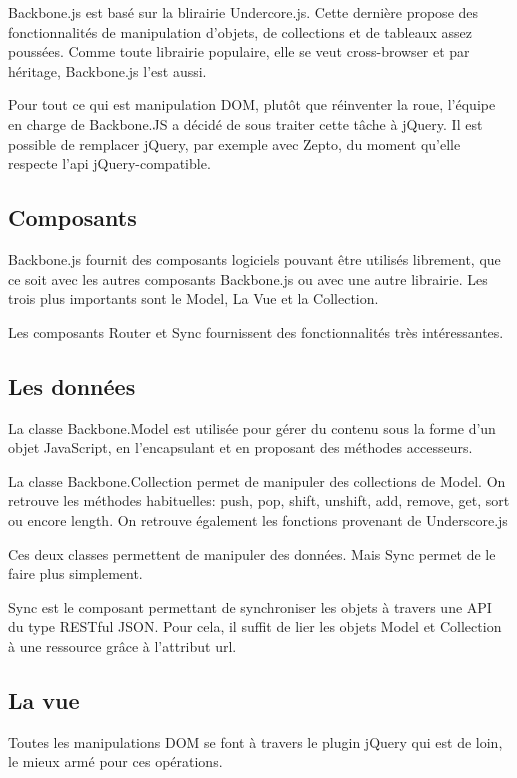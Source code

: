 Backbone.js est basé sur la blirairie Undercore.js. Cette dernière propose des fonctionnalités de manipulation d’objets, de collections et de tableaux assez poussées. Comme toute librairie populaire, elle se veut cross-browser et par héritage, Backbone.js l’est aussi.

Pour tout ce qui est manipulation DOM, plutôt que réinventer la roue, l’équipe en charge de Backbone.JS a décidé de sous traiter cette tâche à jQuery. Il est possible de remplacer jQuery, par exemple avec Zepto, du moment qu’elle respecte l’api jQuery-compatible.

\subsection{Composants}


Backbone.js fournit des composants logiciels pouvant être utilisés librement, que ce soit avec les autres composants Backbone.js ou avec une autre librairie. Les trois plus importants sont le Model, La Vue et la Collection.

Les composants Router et Sync fournissent des fonctionnalités très intéressantes.


\subsection{Les données}


La classe Backbone.Model est utilisée pour gérer du contenu sous la forme d’un objet JavaScript, en l’encapsulant et en proposant des méthodes accesseurs.

La classe Backbone.Collection permet de manipuler des collections de Model. On retrouve les méthodes habituelles: push, pop, shift, unshift, add, remove, get, sort ou encore length. On retrouve également les fonctions provenant de Underscore.js

Ces deux classes permettent de manipuler des données. Mais Sync permet de le faire plus simplement.

Sync est le composant permettant de synchroniser les objets à travers une API du type RESTful JSON. Pour cela, il suffit de lier les objets Model et Collection à une ressource grâce à l’attribut url.

\subsection{La vue}

Toutes les manipulations DOM se font à travers le plugin jQuery qui est de loin, le mieux armé pour ces opérations.

